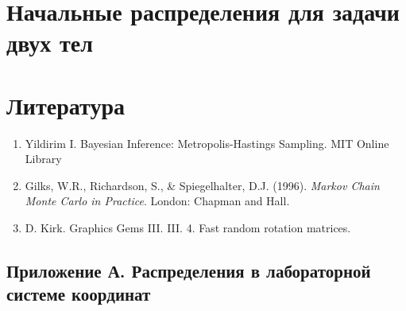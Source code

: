 \documentclass[12pt]{article}
\begin{document}
\section{Начальные распределения для задачи двух тел}







\newpage
\section{Литература}
\begin{enumerate}
	\item Yildirim I. Bayesian Inference: Metropolis-Hastings Sampling. MIT Online Library
	\item Gilks, W.R., Richardson, S., \& Spiegelhalter, D.J. (1996). \textit{Markov Chain Monte Carlo in Practice}. London: Chapman and Hall.
	\item  D. Kirk. Graphics Gems III. III. 4. Fast random rotation matrices. 
\end{enumerate}

\newpage


\begin{appendices}
\section{Приложение А. Распределения в лабораторной системе координат} \label{app1}



\end{appendices}
\end{document}
